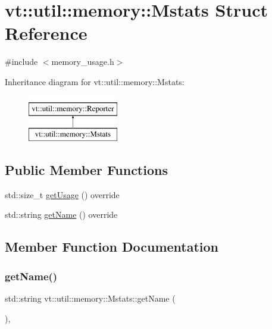 \hypertarget{structvt_1_1util_1_1memory_1_1_mstats}{}\section{vt\+:\+:util\+:\+:memory\+:\+:Mstats Struct Reference}
\label{structvt_1_1util_1_1memory_1_1_mstats}


{\ttfamily \#include $<$memory\+\_\+usage.\+h$>$}

Inheritance diagram for vt\+:\+:util\+:\+:memory\+:\+:Mstats\+:\begin{figure}[H]
\begin{center}
\leavevmode
\includegraphics[height=2.000000cm]{structvt_1_1util_1_1memory_1_1_mstats}
\end{center}
\end{figure}
\subsection*{Public Member Functions}
\begin{DoxyCompactItemize}
\item 
std\+::size\+\_\+t \hyperlink{structvt_1_1util_1_1memory_1_1_mstats_aa3ba12317492d6f3c95f6b2bbb20f831}{get\+Usage} () override
\item 
std\+::string \hyperlink{structvt_1_1util_1_1memory_1_1_mstats_a4718704523896839b8c7955d1098b647}{get\+Name} () override
\end{DoxyCompactItemize}


\subsection{Member Function Documentation}
\mbox{\label{structvt_1_1util_1_1memory_1_1_mstats_a4718704523896839b8c7955d1098b647}} 
\subsubsection{\texorpdfstring{get\+Name()}{getName()}}
{\footnotesize\ttfamily std\+::string vt\+::util\+::memory\+::\+Mstats\+::get\+Name (\begin{DoxyParamCaption}{ }\end{DoxyParamCaption})\hspace{0.3cm}{\ttfamily [override]}, {\ttfamily [virtual]}}



